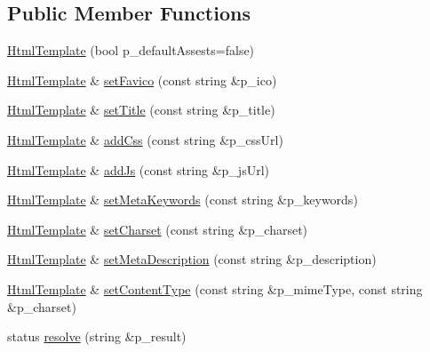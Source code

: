 \subsection*{Public Member Functions}
\begin{DoxyCompactItemize}
\item 
\hyperlink{classxtd_1_1network_1_1http_1_1HtmlTemplate_a2e40e5f2ad3b6b5cdb8b8f73656efe6d}{Html\-Template} (bool p\-\_\-default\-Assests=false)
\item 
\hyperlink{classxtd_1_1network_1_1http_1_1HtmlTemplate}{Html\-Template} \& \hyperlink{classxtd_1_1network_1_1http_1_1HtmlTemplate_a92496dd5d269160aeb2640908b1920a1}{set\-Favico} (const string \&p\-\_\-ico)
\item 
\hyperlink{classxtd_1_1network_1_1http_1_1HtmlTemplate}{Html\-Template} \& \hyperlink{classxtd_1_1network_1_1http_1_1HtmlTemplate_a360a57a8ca473b72fd76807d5cc7265a}{set\-Title} (const string \&p\-\_\-title)
\item 
\hyperlink{classxtd_1_1network_1_1http_1_1HtmlTemplate}{Html\-Template} \& \hyperlink{classxtd_1_1network_1_1http_1_1HtmlTemplate_a29763c3949d6906bdbe02e9b147deacc}{add\-Css} (const string \&p\-\_\-css\-Url)
\item 
\hyperlink{classxtd_1_1network_1_1http_1_1HtmlTemplate}{Html\-Template} \& \hyperlink{classxtd_1_1network_1_1http_1_1HtmlTemplate_a4a16bbd6749d71c5fe72d9e8bf3c1fa8}{add\-Js} (const string \&p\-\_\-js\-Url)
\item 
\hyperlink{classxtd_1_1network_1_1http_1_1HtmlTemplate}{Html\-Template} \& \hyperlink{classxtd_1_1network_1_1http_1_1HtmlTemplate_a1a87439632dc4f30fb247602b1bbadba}{set\-Meta\-Keywords} (const string \&p\-\_\-keywords)
\item 
\hyperlink{classxtd_1_1network_1_1http_1_1HtmlTemplate}{Html\-Template} \& \hyperlink{classxtd_1_1network_1_1http_1_1HtmlTemplate_a67b44ce076eac00c888eb24ec3b9675b}{set\-Charset} (const string \&p\-\_\-charset)
\item 
\hyperlink{classxtd_1_1network_1_1http_1_1HtmlTemplate}{Html\-Template} \& \hyperlink{classxtd_1_1network_1_1http_1_1HtmlTemplate_a4ef586066cbae8ffc86e851dbb43782c}{set\-Meta\-Description} (const string \&p\-\_\-description)
\item 
\hyperlink{classxtd_1_1network_1_1http_1_1HtmlTemplate}{Html\-Template} \& \hyperlink{classxtd_1_1network_1_1http_1_1HtmlTemplate_ad2b01a5058edcc704e2f0057e7cd7d06}{set\-Content\-Type} (const string \&p\-\_\-mime\-Type, const string \&p\-\_\-charset)
\item 
status \hyperlink{classxtd_1_1network_1_1http_1_1HtmlTemplate_af621b5bf866fa828f0bd5eaf225d5f70}{resolve} (string \&p\-\_\-result)
\end{DoxyCompactItemize}
